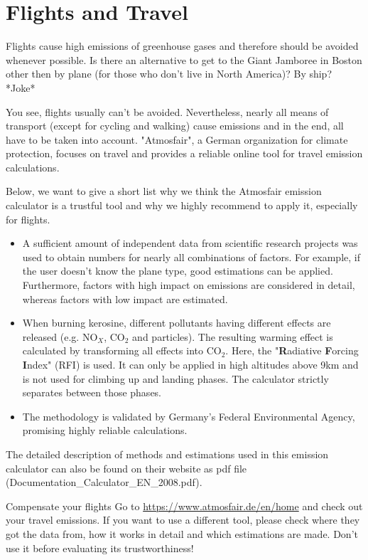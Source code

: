 \section{Flights and Travel}
Flights cause high emissions of greenhouse gases and therefore should be avoided whenever possible. Is there an alternative to get to the Giant Jamboree in Boston other then by plane (for those who don't live in North America)? By ship? *Joke* 


You see, flights usually can't be avoided. Nevertheless, nearly all means of transport (except for cycling and walking) cause emissions and in the end, all have to be taken into account. 
"Atmosfair", a German organization for climate protection, focuses on travel and provides a reliable online tool for travel emission calculations.


Below, we want to give a short list why we think the Atmosfair emission calculator is a trustful tool and why we highly recommend to apply it, especially for flights. 

\begin{itemize}
	\item A sufficient amount of independent data from scientific research projects was used to obtain numbers for nearly all combinations of factors. For example, if the user doesn't know the plane type, good estimations can be applied. Furthermore, factors with high impact on emissions are considered in detail, whereas factors with low impact are estimated.
	
	\item When burning kerosine, different pollutants having different effects are released (e.g. NO$_X$, CO$_2$ and particles). The resulting warming effect is calculated by transforming all effects into CO$_2$. Here, the "\textbf{R}adiative \textbf{F}orcing \textbf{I}ndex" (RFI) is used. It can only be applied in high altitudes above 9km and is not used for climbing up and landing phases. The calculator strictly separates between those phases.
	
	\item The methodology is validated by Germany's Federal Environmental Agency, promising highly reliable calculations.
\end{itemize}

The detailed description of methods and estimations used in this emission calculator can also be found on their website as pdf file (Documentation\_Calculator\_EN\_2008.pdf). \cite{flight_calc}%

\begin{suggest} {Compensate your flights}
	Go to \url{https://www.atmosfair.de/en/home} and check out your travel emissions. If you want to use a different tool, please check where they got the data from, how it works in detail and which estimations are made. Don't use it before evaluating its trustworthiness!
\end{suggest}
